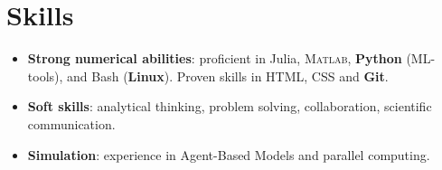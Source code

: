 \section{Skills}
\begin{itemize}
\item \textbf{Strong numerical abilities}: proficient in Julia, \textsc{Matlab}, \textbf{Python} (ML-tools), and Bash (\textbf{Linux}). Proven skills in HTML, CSS and \textbf{Git}.
\item \textbf{Soft skills}: analytical thinking, problem solving, collaboration, scientific communication.
\item \textbf{Simulation}: experience in Agent-Based Models and parallel computing.
\end{itemize} 